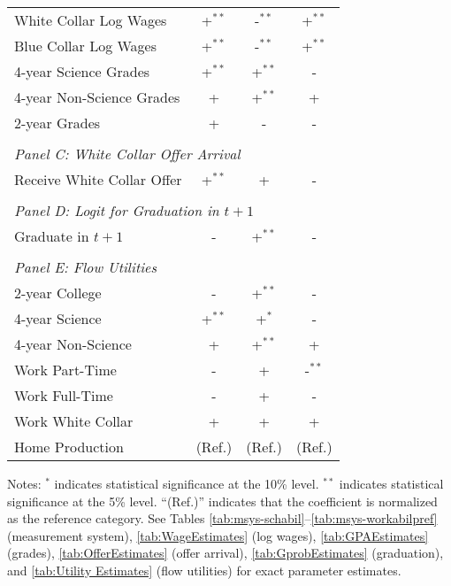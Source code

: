 \begin{table}[ht]
{\begin{threeparttable}
\begin{tabular}{lccc}
White Collar Log Wages    & +$^{\ast\ast}$ & -$^{\ast\ast}$ & +$^{\ast\ast}$ \\
Blue Collar Log Wages     & +$^{\ast\ast}$ & -$^{\ast\ast}$ & +$^{\ast\ast}$ \\
4-year Science Grades     & +$^{\ast\ast}$ & +$^{\ast\ast}$ & -\phantom{$^{\ast\ast}$} \\
4-year Non-Science Grades & +\phantom{$^{\ast\ast}$} & +$^{\ast\ast}$ & +\phantom{$^{\ast\ast}$} \\
2-year Grades             & +\phantom{$^{\ast\ast}$} & -\phantom{$^{\ast\ast}$} & -\phantom{$^{\ast\ast}$} \\
 & & & \\
\multicolumn{4}{l}{\textit{Panel C: White Collar Offer Arrival}} \\
Receive White Collar Offer & +$^{\ast\ast}$ & +\phantom{$^{\ast\ast}$} & -\phantom{$^{\ast\ast}$} \\
 & & & \\
\multicolumn{4}{l}{\textit{Panel D: Logit for Graduation in $t+1$}} \\
Graduate in $t+1$ & -\phantom{$^{\ast\ast}$} & +$^{\ast\ast}$ & -\phantom{$^{\ast\ast}$} \\
 & & & \\
\multicolumn{4}{l}{\textit{Panel E: Flow Utilities}} \\
2-year College & -\phantom{$^{\ast\ast}$} & +$^{\ast\ast}$ & -\phantom{$^{\ast\ast}$} \\
4-year Science & +$^{\ast\ast}$ & +$^\ast$\phantom{$^{\ast}$} & -\phantom{$^{\ast\ast}$} \\
4-year Non-Science & +\phantom{$^{\ast\ast}$} & +$^{\ast\ast}$ & +\phantom{$^{\ast\ast}$} \\
Work Part-Time & -\phantom{$^{\ast\ast}$} & +\phantom{$^{\ast\ast}$} & -$^{\ast\ast}$ \\
Work Full-Time & -\phantom{$^{\ast\ast}$} & +\phantom{$^{\ast\ast}$} & -\phantom{$^{\ast\ast}$} \\
Work White Collar & +\phantom{$^{\ast\ast}$} & +\phantom{$^{\ast\ast}$} & +\phantom{$^{\ast\ast}$} \\
Home Production & (Ref.) & (Ref.) & (Ref.) \\
\bottomrule
\end{tabular}
\footnotesize Notes: $^\ast$ indicates statistical significance at the 10\% level. $^{\ast\ast}$ indicates statistical significance at the 5\% level. ``(Ref.)'' indicates that the coefficient is normalized as the reference category. See Tables \ref{tab:msys-schabil}--\ref{tab:msys-workabilpref} (measurement system), \ref{tab:WageEstimates} (log wages), \ref{tab:GPAEstimates} (grades), \ref{tab:OfferEstimates} (offer arrival), \ref{tab:GprobEstimates} (graduation), and \ref{tab:Utility Estimates} (flow utilities) for exact parameter estimates. 
\end{threeparttable}
}
\end{table}
